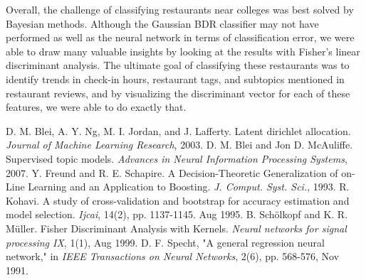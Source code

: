 \documentclass[10pt,twocolumn,letterpaper]{article}
\begin{document}
Overall, the challenge of classifying restaurants near colleges was
best solved by Bayesian methods. Although the Gaussian BDR classifier may not
have performed as well as the neural network in terms of classification error,
we were able to draw many valuable insights by looking at the results with
Fisher's linear discriminant analysis. The ultimate goal of classifying these
restaurants was to identify trends in check-in hours, restaurant tags, and
subtopics mentioned in restaurant reviews, and by visualizing the discriminant
vector for each of these features, we were able to do exactly that.

\begin{thebibliography}{9}
    D. M. Blei, A. Y. Ng, M. I. Jordan, and J. Lafferty.
    Latent dirichlet allocation. \textit{Journal of Machine Learning Research},
    2003.
    D. M. Blei and Jon D. McAuliffe. Supervised topic models.
    \textit{Advances in Neural Information Processing
    Systems}, 2007.
    Y. Freund and R. E. Schapire. A Decision-Theoretic Generalization of
    on-Line Learning and an Application to Boosting. \textit{J. Comput. Syst.
    Sci.}, 1993.
    R. Kohavi. A study of cross-validation and bootstrap for accuracy estimation
    and model selection. \textit{Ijcai}, 14(2), pp. 1137-1145. Aug 1995.
    B. Sch{\"o}lkopf and K. R. M{\"u}ller.
    Fisher Discriminant Analysis with Kernels. \textit{Neural networks for
    signal processing IX}, 1(1), Aug 1999.
    D. F. Specht, "A general regression neural network," in \textit{IEEE
    Transactions on Neural Networks}, 2(6), pp. 568-576, Nov 1991.

\end{thebibliography}



\end{document}
